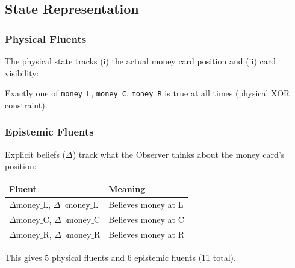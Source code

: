 \documentclass[letterpaper, 10 pt, conference]{ieeeconf}  %
\newcommand{\EBel}[1]{\ensuremath{\Delta #1}} %
\begin{document}
\subsection{State Representation}

\subsubsection{Physical Fluents}

The physical state tracks (i) the actual money card position and (ii) card visibility:

\begin{center}
\end{center}

Exactly one of \texttt{money\_L}, \texttt{money\_C}, \texttt{money\_R} is true at all times (physical XOR constraint).

\subsubsection{Epistemic Fluents}

Explicit beliefs ($\Delta$) track what the Observer thinks about the money card's position:

\begin{center}
\begin{tabular}{ll}
\toprule
\textbf{Fluent} & \textbf{Meaning} \\
\midrule
$\EBel{\text{money\_L}}$, $\EBel{\neg\text{money\_L}}$ & Believes money at L \\
$\EBel{\text{money\_C}}$, $\EBel{\neg\text{money\_C}}$ & Believes money at C \\
$\EBel{\text{money\_R}}$, $\EBel{\neg\text{money\_R}}$ & Believes money at R \\
\bottomrule
\end{tabular}
\end{center}

This gives 5 physical fluents and 6 epistemic fluents (11 total).
\end{document}
